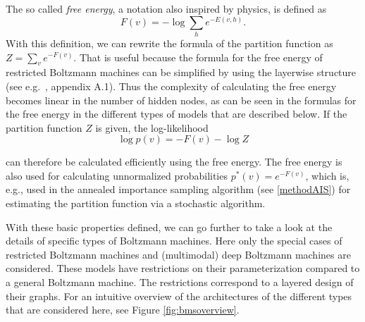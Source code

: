 \documentclass[12pt]{article}
\begin{document}
The so called \emph{free energy}, a notation also inspired by physics, is defined as
\[
   F(v) = - \log \sum_h e^{-E(v, h)}.
\]
With this definition, we can rewrite the formula of the partition function as $Z = \sum_v e^{-F(v)}$.
That is useful because the formula for the free energy of restricted Boltzmann machines can be simplified by using the layerwise structure (see e.g.~\cite{martens_representational_2013}, appendix A.1).
Thus the complexity of calculating the free energy becomes linear in the number of hidden nodes, as can be seen in the formulas for the free energy in the different types of models that are described below.
If the partition function $Z$ is given, the log-likelihood
\begin{equation}
   \log p(v) = - F(v) - \log Z
\label{eqn:pRBMfreeenergy}
\end{equation}

can therefore be calculated efficiently using the free energy. The free energy is also used for calculating unnormalized probabilities $p^*(v) = e^{-F(v)}$, which is, e.g., used in the annealed importance sampling algorithm (see \ref{methodAIS}) for estimating the partition function via a stochastic algorithm.

With these basic properties defined, we can go further to take a look at the details of specific types of Boltzmann machines.
Here only the special cases of restricted Boltzmann machines and (multimodal) deep Boltzmann machines are considered.
These models have restrictions on their parameterization compared to a general Boltzmann machine.
The restrictions correspond to a layered design of their graphs.
For an intuitive overview of the architectures of the different types that are considered here, see Figure \ref{fig:bmsoverview}.
\end{document}
